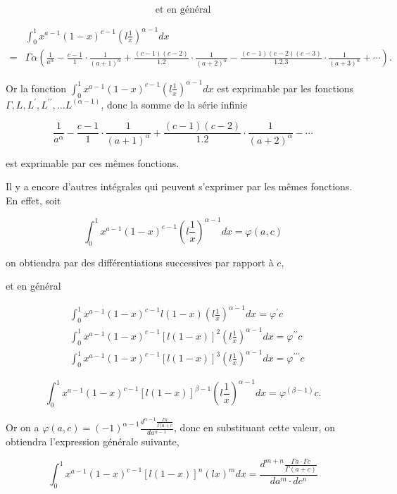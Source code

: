 \documentclass{article}
\begin{document}
\[
\text { et en général }
\]

\[
\begin{aligned}
& \int_{0}^{1} x^{a-1}(1-x)^{c-1}\left(l \frac{1}{x}\right)^{\alpha-1} d x \\
= & \Gamma \alpha\left(\frac{1}{a^{\alpha}}-\frac{c-1}{1} \cdot \frac{1}{(a+1)^{\alpha}}+\frac{(c-1)(c-2)}{1.2} \cdot \frac{1}{(a+2)^{\alpha}}-\frac{(c-1)(c-2)(c-3)}{1.2 .3} \cdot \frac{1}{(a+3)^{\alpha}}+\cdots\right) .
\end{aligned}
\]

Or la fonction \(\int_{0}^{1} x^{a-1}(1-x)^{c-1}\left(l \frac{1}{x}\right)^{\alpha-1} d x\) est exprimable par les fonctions \(\Gamma, L, L^{\prime}, L^{\prime \prime}, \ldots L^{(\alpha-1)}\), donc la somme de la série infinie

\[
\frac{1}{a^{\alpha}}-\frac{c-1}{1} \cdot \frac{1}{(a+1)^{\alpha}}+\frac{(c-1)(c-2)}{1.2} \cdot \frac{1}{(a+2)^{\alpha}}-\cdots
\]

est exprimable par ces mêmes fonctions.

Il y a encore d'autres intégrales qui peuvent s'exprimer par les mêmes fonctions. En effet, soit

\[
\int_{0}^{1} x^{a-1}(1-x)^{c-1}\left(l \frac{1}{x}\right)^{\alpha-1} d x=\varphi(a, c)
\]

on obtiendra par des différentiations successives par rapport à \(c\),

et en général

\[
\begin{aligned}
& \int_{0}^{1} x^{a-1}(1-x)^{c-1} l(1-x)\left(l \frac{1}{x}\right)^{\alpha-1} d x=\varphi^{\prime} c \\
& \int_{0}^{1} x^{a-1}(1-x)^{c-1}[l(1-x)]^{2}\left(l \frac{1}{x}\right)^{\alpha-1} d x=\varphi^{\prime \prime} c \\
& \int_{0}^{1} x^{a-1}(1-x)^{c-1}[l(1-x)]^{3}\left(l \frac{1}{x}\right)^{\alpha-1} d x=\varphi^{\prime \prime \prime} c
\end{aligned}
\]

\[
\int_{0}^{1} x^{a-1}(1-x)^{c-1}[l(1-x)]^{\beta-1}\left(l \frac{1}{x}\right)^{\alpha-1} d x=\varphi^{(\beta-1)} c .
\]

Or on a \(\varphi(a, c)=(-1)^{\alpha-1} \frac{d^{\alpha-1} \frac{\Gamma a}{\Gamma(a+c}}{d a^{\alpha-1}}\), donc en substituant cette valeur, on obtiendra l'expression générale suivante,

\[
\int_{0}^{1} x^{a-1}(1-x)^{c-1}[l(1-x)]^{n}(l x)^{m} d x=\frac{d^{m+n} \frac{\Gamma a \cdot \Gamma c}{\Gamma(a+c)}}{d a^{m} \cdot d c^{n}}
\]
\end{document}
